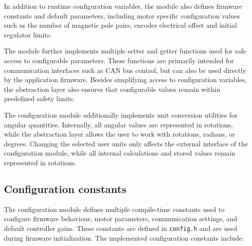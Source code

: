 In addition to runtime configuration variables, the module also defines firmware constants and default parameters,
including motor specific configuration values such as the number of magnetic pole pairs,
encoder electrical offset and initial regulator limits.

The module further implements multiple setter and getter functions used for safe access to configurable parameters.
These functions are primarily intended for communication interfaces such as CAN bus control,
but can also be used directly by the application firmware.
Besides simplifying access to configuration variables, the abstraction layer also ensures that configurable values remain within predefined safety limits.

The configuration module additionally implements unit conversion utilities for angular quantities.
Internally, all angular values are represented in rotations,
while the abstraction layer allows the user to work with rotations, radians, or degrees.
Changing the selected user units only affects the external interface of the configuration module,
while all internal calculations and stored values remain represented in rotations.

\subsection{Configuration constants}
The configuration module defines multiple compile-time constants used to configure firmware behaviour,
motor parameters, communication settings, and default controller gains.
These constants are defined in \texttt{config.h} and are used during firmware initialization.
\newpage
The implemented configuration constants include:

